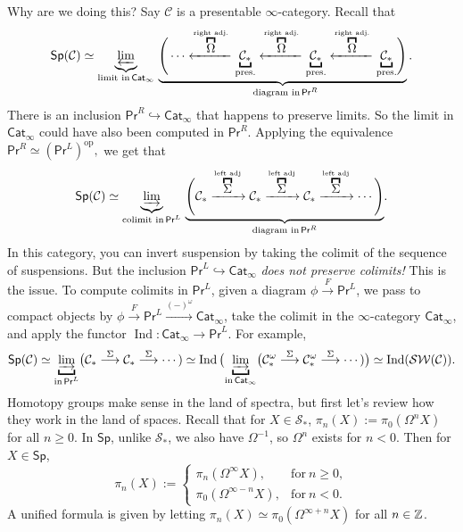 Why are we doing this? Say $\mathcal{C} $ is a presentable $\infty$-category. Recall that \[
    \mathsf{Sp} (\mathcal{C} )\simeq \underset{\text{limit in} \, \mathsf{Cat} _{\infty}}{\underbrace{ \varprojlim }} \ \underset{\text{diagram in} \, \mathsf{Pr} ^R}{\underbrace{ \Bigg( \cdots \xleftarrow{\overset{\text{right adj.}}{\overbracket{ \Omega}} } \underset{\text{pres.}}{\underbracket{\mathcal{C} _*}}  \xleftarrow{\overset{\text{right adj.}}{\overbracket{ \Omega}} } \underset{\text{pres.}}{\underbracket{\mathcal{C} _*}} \xleftarrow{\overset{\text{right adj.}}{\overbracket{ \Omega}} } \underset{\text{pres.}}{\underbracket{\mathcal{C} _*}}   \Bigg)}.
} \] There is an inclusion $\mathsf{Pr} ^R \hookrightarrow \mathsf{Cat} _{\infty}$ that happens to preserve limits. So the limit in $\mathsf{Cat} _{\infty}$ could have also been computed in $\mathsf{Pr} ^R$. Applying the equivalence $\mathsf{Pr} ^R \simeq (\mathsf{Pr} ^L)^{\mathrm{op}},$ we get that \[
\mathsf{Sp} (\mathcal{C} ) \simeq \underset{\text{colimit in} \, \mathsf{Pr}^L }{\underbrace{ \varinjlim }} \
\underset{\text{diagram in} \, \mathsf{Pr} ^R}{\underbrace{ \Bigg(\mathcal{C} _* \xrightarrow{\overset{\text{left adj} }{\overbracket{\Sigma}}  }  \mathcal{C} _* \xrightarrow{\overset{\text{left adj} }{\overbracket{\Sigma}}  }\mathcal{C} _* \xrightarrow{\overset{\text{left adj} }{\overbracket{\Sigma}}  }\cdots \Bigg)}}.
\] In this category, you can invert suspension by taking the colimit of the sequence of suspensions. But the inclusion $\mathsf{Pr} ^L \hookrightarrow \mathsf{Cat} _{\infty}$ \emph{does not preserve colimits!} This is the issue. To compute colimits in $\mathsf{Pr} ^L$, given a diagram $\phi \overset{F}{\to } \mathsf{Pr} ^L$, we pass to compact objects by $\phi \xrightarrow{F}  \mathsf{Pr} ^L \xrightarrow{(-)^{\omega}} \mathsf{Cat} _{\infty}$, take the colimit in the $\infty$-category $\mathsf{Cat} _{\infty}$, and apply the functor $\operatorname{Ind} \colon \mathsf{Cat} _{\infty} \to \mathsf{Pr} ^L$. For example, \[
\mathsf{Sp} (\mathcal{C} ) \simeq \underset{\text{in} \, \mathsf{Pr} ^L}{\underbracket{ \varinjlim} }\big( \mathcal{C} _* \overset{\Sigma}{\longrightarrow} \mathcal{C} _* \overset{\Sigma}{\longrightarrow} \cdots ) \simeq \operatorname{Ind}\big( \underset{\text{in} \, \mathsf{Cat} _{\infty}}{\underbracket{ \varinjlim} }\big( \mathcal{C}^{\omega} _* \overset{\Sigma}{\longrightarrow} \mathcal{C} ^{\omega}_* \overset{\Sigma}{\longrightarrow} \cdots ) \big) \simeq  \operatorname{Ind}(\mathcal{SW} (\mathcal{C} )).
    \] 
    Homotopy groups make sense in the land of spectra, but first let's review how they work in the land of spaces. Recall that for $X \in \mathcal{S} _*$, $\pi_n (X) := \pi_0(\Omega ^n  X)$ for all $n\geq 0$. In $\mathsf{Sp} $, unlike $\mathcal{S} _*$, we also have $\Omega ^{-1}$, so $\Omega ^n $ exists for $n<0$. Then for $X \in \mathsf{Sp} $, \[
        \pi _n (X) :=
        \begin{cases}
            \pi _n (\Omega ^{\infty}X),& \text{for} \ n \geq 0,\\
            \pi_0( \Omega ^{\infty-n}X),& \text{for} \ n<0.
        \end{cases}
    \] A unified formula is given by letting $\pi_n (X) \simeq  \pi_0 (\Omega ^{\infty+n}X)$ for all $n \in \mathbb{Z}$.

